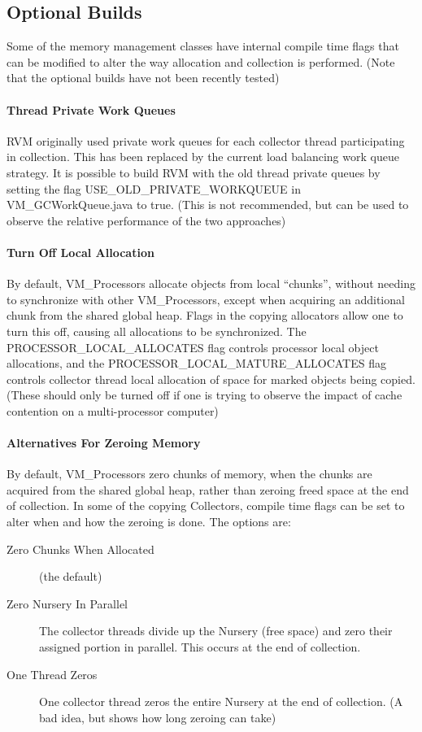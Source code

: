 \subsection{Optional Builds} \label{ssses:optionalbuilds}
Some of the memory management classes have internal compile
time flags that can be modified to alter the way allocation 
and collection is performed.
(Note that the optional builds have not been recently tested)

\paragraph{Thread Private Work Queues}
RVM originally used private work queues for each collector thread
participating in collection.  This has been replaced by the current
load balancing work queue strategy.  It is possible to build RVM
with the old thread private queues by setting the flag
USE\_OLD\_PRIVATE\_WORKQUEUE in VM\_GCWorkQueue.java to true.
(This is not recommended, but can be used to observe the relative
performance of the two approaches)

\paragraph{Turn Off Local Allocation} 
By default, VM\_Processors allocate objects from local ``chunks'', without
needing to synchronize with other VM\_Processors, except when acquiring
an additional chunk from the shared global heap.  Flags in the
copying allocators allow one to turn this off, causing all allocations
to be synchronized. 
The PROCESSOR\_LOCAL\_ALLOCATES flag controls processor local object
allocations, and the PROCESSOR\_LOCAL\_MATURE\_ALLOCATES flag controls
collector thread local allocation of space for marked objects being
copied. (These should only be turned off if one is trying to observe
the impact of cache contention on a multi-processor computer)

\paragraph{Alternatives For Zeroing Memory}
By default, VM\_Processors zero chunks of memory, when the chunks are
acquired from the shared global heap, rather than zeroing freed
space at the end of collection.  In some of the copying Collectors,
compile time flags can be set to alter when and how the zeroing is
done.  The options are:
\begin{description}
\item[Zero Chunks When Allocated] (the default)
\item[Zero Nursery In Parallel] The collector threads divide up the
Nursery (free space) and zero their assigned portion in parallel.
This occurs at the end of collection.
\item[One Thread Zeros] One collector thread zeros the entire Nursery
at the end of collection. (A bad idea, but shows how long zeroing can take)
\end{description}



